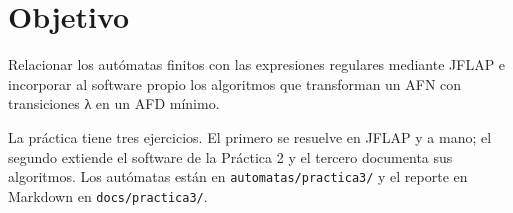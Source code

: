 \documentclass[12pt]{article}
\begin{document}


\tableofcontents
\clearpage

\section{Objetivo}
Relacionar los autómatas finitos con las expresiones regulares mediante JFLAP e incorporar al software propio los algoritmos que transforman un AFN con transiciones λ en un AFD mínimo.

La práctica tiene tres ejercicios. El primero se resuelve en JFLAP y a mano; el segundo extiende el software de la Práctica 2 y el tercero documenta sus algoritmos. Los autómatas están en \texttt{automatas/practica3/} y el reporte en Markdown en \texttt{docs/practica3/}.






\clearpage
\printbibliography[title={Referencias}]
\end{document}
